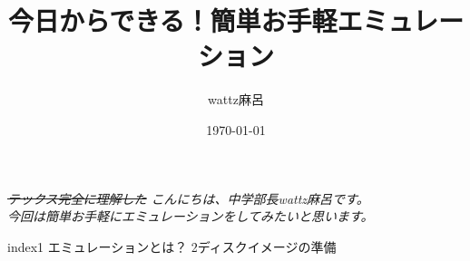 \documentclass[b5paper,9pt,platex,dvipdfmx]{jsarticle}
\begin{document}
\title{今日からできる！簡単お手軽エミュレーション}
\author{wattz麻呂}
\date{\today}
\maketitle
\thispagestyle{empty}

\begin{multicols*}{3}
  
\it  \sout{テックス完全に理解した} \sc
こんにちは、中学部長wattz麻呂です。\\
今回は簡単お手軽にエミュレーションをしてみたいと思います。\\
\begin{itembox}{index}{1}
エミュレーションとは？
{2}ディスクイメージの準備
\end{itembox}

\end{multicols*}
\end{document}
